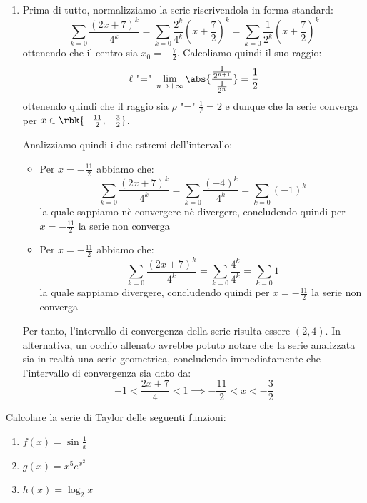 \documentclass[a4paper, 12pt]{report}
\begin{document}
\begin{enumerate}
        \item Prima di tutto, normalizziamo la serie riscrivendola in forma standard:
        \[\sum\limits_{k = 0} \dfrac{(2x+7)^k}{4^k} = \sum\limits_{k = 0} \dfrac{2^k}{4^k}(x+\frac{7}{2})^k = \sum\limits_{k = 0} \dfrac{1}{2^k}(x+\frac{7}{2})^k\]
        ottenendo che il centro sia $x_0= -\frac{7}{2}$. Calcoliamo quindi il suo raggio:
        \[\ell \text{ "=" }\lim_{n \to +\infty} \abs{\frac{\frac{1}{2^{n+1}}}{\frac{1}{2^n}}} = \frac{1}{2}\]
        ottenendo quindi che il raggio sia $\rho \text{ "=" } \frac{1}{\ell} = 2$ e dunque che la serie converga per $x \in \rbk{-\frac{11}{2}, -\frac{3}{2}}$. 

        Analizziamo quindi i due estremi dell'intervallo:
        \begin{itemize}
            \item Per $x = -\frac{11}{2}$ abbiamo che:
            \[\sum\limits_{k = 0} \dfrac{(2x+7)^k}{4^k} = \sum\limits_{k = 0} \dfrac{(-4)^k}{4^k} = \sum\limits_{k = 0} (-1)^k\]
            la quale sappiamo nè convergere nè divergere, concludendo quindi per $x = -\frac{11}{2}$ la serie non converga

            \item Per $x = -\frac{11}{2}$ abbiamo che:
            \[\sum\limits_{k = 0} \dfrac{(2x+7)^k}{4^k} = \sum\limits_{k = 0} \dfrac{4^k}{4^k} = \sum\limits_{k = 0} 1\]
            la quale sappiamo divergere, concludendo quindi per $x = -\frac{11}{2}$ la serie non converga
        
        \end{itemize}

        Per tanto, l'intervallo di convergenza della serie risulta essere $(2, 4)$. In alternativa, un occhio allenato avrebbe potuto notare che la serie analizzata sia in realtà una serie geometrica, concludendo immediatamente che l'intervallo di convergenza sia dato da:
        \[-1 < \frac{2x+7}{4} < 1 \implies -\frac{11}{2} < x < -\frac{3}{2}\]
    \end{enumerate}

    \begin{framedprob}{}
        Calcolare la serie di Taylor delle seguenti funzioni:
        \begin{enumerate}
            \item $f(x) = \sin \frac{1}{x}$
            \item $g(x) = x^5e^{x^2}$
            \item $h(x) = \log_2 x$
        \end{enumerate}
    \end{framedprob}
\end{document}

